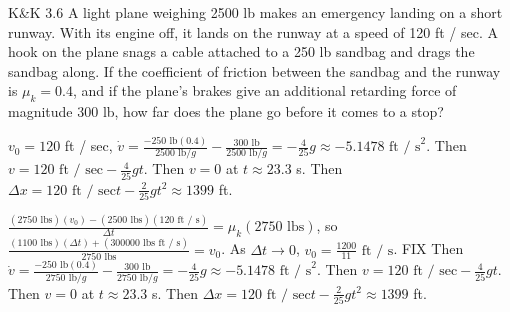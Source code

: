 \documentclass{esg8012pset}
\begin{document}
\begin{problem}{K\&K 3.6}
  A light plane weighing 2500 lb makes an emergency landing on a short runway. With its engine off, it lands on the runway at a speed of 120 ft / sec. A hook on the plane snags a cable attached to a 250 lb sandbag and drags the sandbag along. If the coefficient of friction between the sandbag and the runway is $\mu_k = 0.4$, and if the plane's brakes give an additional retarding force of magnitude 300 lb, how far does the plane go before it comes to a stop?
\end{problem}
\begin{solution}
  $v_0 = 120$ ft / sec, $\dot v = \frac{-250\text{ lb}(0.4)}{2500\text{ lb} / g} - \frac{300\text{ lb}}{2500\text{ lb} / g} = -\frac{4}{25} g \approx -5.1478\text{ ft / s}^2$.  Then $v = 120\text{ ft / sec} -\frac{4}{25} g t$.  Then $v = 0$ at $t \approx 23.3$ s.  Then $\Delta x = 120\text{ ft / sec} t - \frac{2}{25} g t^2 \approx 1399$ ft.


   $\frac{(2750\text{ lbs})(v_0) - (2500\text{ lbs})(120\text{ ft / s})}{\Delta t} = \mu_k (2750\text{ lbs})$, so $\frac{(1100\text{ lbs})(\Delta t) + (300000\text{ lbs ft / s})}{2750\text{ lbs}} = v_0$.  As $\Delta t \longrightarrow 0$, $v_0 = \frac{1200}{11}\text{ ft / s}$.  FIX Then $\dot v = \frac{-250\text{ lb}(0.4)}{2750\text{ lb} / g} - \frac{300\text{ lb}}{2750\text{ lb} / g} = -\frac{4}{25} g \approx -5.1478\text{ ft / s}^2$.  Then $v = 120\text{ ft / sec} -\frac{4}{25} g t$.  Then $v = 0$ at $t \approx 23.3$ s.  Then $\Delta x = 120\text{ ft / sec} t - \frac{2}{25} g t^2 \approx 1399$ ft.
\end{solution}
\end{document}
